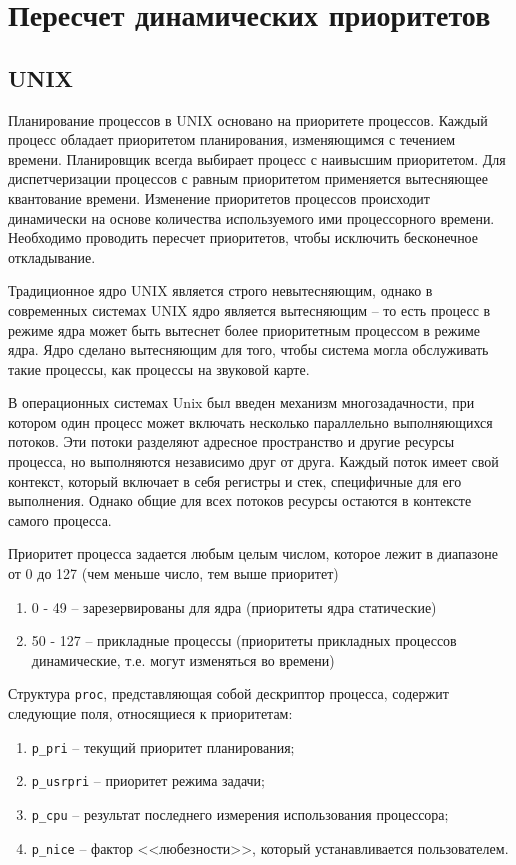 \chapter{Пересчет динамических приоритетов}

\section{UNIX}

Планирование процессов в UNIX основано на приоритете процессов. Каждый процесс обладает приоритетом планирования, изменяющимся с течением времени. Планировщик всегда выбирает процесс с наивысшим приоритетом. Для диспетчеризации процессов с равным приоритетом применяется вытесняющее квантование времени. Изменение приоритетов процессов происходит динамически на основе количества используемого ими процессорного времени. Необходимо проводить пересчет приоритетов, чтобы исключить бесконечное откладывание.

Традиционное ядро UNIX является строго невытесняющим, однако в современных системах UNIX ядро является вытесняющим -- то есть процесс в режиме ядра может быть вытеснет более приоритетным процессом в режиме ядра. Ядро сделано вытесняющим для того, чтобы система могла обслуживать такие процессы, как процессы на звуковой карте. 

В операционных системах Unix был введен механизм многозадачности,
при котором один процесс может включать несколько параллельно выполняющихся потоков. Эти потоки разделяют адресное пространство и другие ресурсы процесса, но выполняются независимо друг от друга. Каждый поток имеет свой контекст, который включает в себя регистры и стек, специфичные для его выполнения. Однако общие для всех потоков ресурсы остаются
в контексте самого процесса.

Приоритет процесса задается любым целым числом, которое лежит в диапазоне от 0 до 127 (чем меньше число, тем выше приоритет)
\begin{enumerate}
	\item 0 - 49 -- зарезервированы для ядра (приоритеты ядра статические)
	\item 50 - 127 -- прикладные процессы (приоритеты прикладных процессов динамические, т.е. могут изменяться во времени)
\end{enumerate}

Структура \texttt{proc}, представляющая собой дескриптор процесса, содержит следующие поля, относящиеся к приоритетам:
\begin{enumerate}
	\item \texttt{p\_pri} -- текущий приоритет планирования;
	\item \texttt{p\_usrpri} -- приоритет режима задачи;
	\item \texttt{p\_cpu} -- результат последнего измерения использования процессора;
	\item \texttt{p\_nice} -- фактор <<любезности>>, который устанавливается пользователем.
\end{enumerate}

